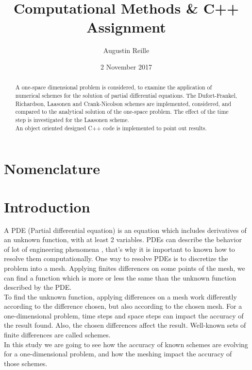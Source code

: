 \documentclass{article}
\title{Computational Methods \& C++ Assignment}
\author{Augustin Reille}
\date{2 November 2017}
\begin{document}
    \maketitle

    \begin{abstract}
        A one-space dimensional problem is considered, to examine the application
        of numerical schemes for the solution of partial differential equations. 
        The Dufort-Frankel, Richardson, Laasonen and Crank-Nicolson schemes are implemented,
        considered, and compared to the analytical solution of the one-space problem.
        The effect of the time step is investigated for the Laasonen scheme.
        \\ An object oriented designed C++ code is implemented to point out results.
    \end{abstract}

    \newpage
    \tableofcontents

    \newpage
    \listoffigures

    \listoftables

    \section*{Nomenclature}
        
    \newpage
    \section{Introduction}

    A PDE (Partial differential equation) is an equation which includes derivatives of an unknown function, with at least 2 variables.
    PDEs can describe the behavior of lot of engineering phenomena \cite{pde}, that's why it is important to 
    known how to resolve them computationally. One way to resolve PDEs is to discretize the problem into
    a mesh. Applying finites differences on some points of the mesh, we can find a function
    which is more or less the same than the unknown function described by the PDE.
    \\
    To find the unknown function, applying differences on a mesh work differently according to the difference chosen, 
    but also according to the chosen mesh. For a one-dimensional problem, time steps and space steps can impact the accuracy
    of the result found. Also, the chosen differences affect the result. Well-known sets of finite differences are called schemes.
    \\
    In this study we are going to see how the accuracy of known schemes are evolving for a one-dimensional problem, and how the 
    meshing impact the accuracy of those schemes.
    
\end{document}
